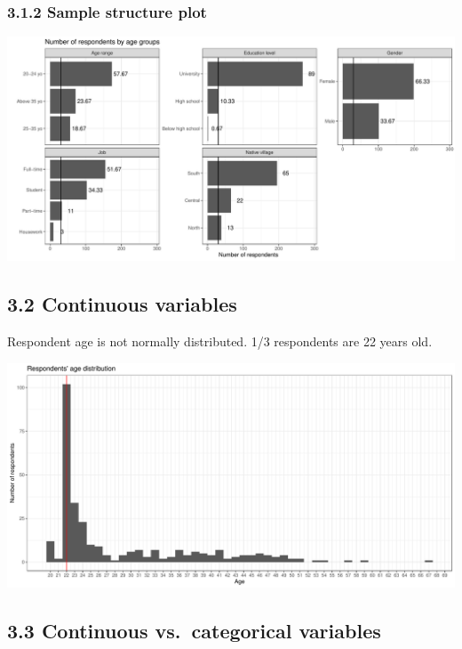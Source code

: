 \documentclass[]{article}
\begin{document}
\hypertarget{sample-structure-plot}{%
\subsubsection{3.1.2 Sample structure
plot}\label{sample-structure-plot}}

\includegraphics{Consumer-attitude-towards-fish-sauce-products_files/figure-latex/unnamed-chunk-6-1.pdf}

\hypertarget{continuous-variables}{%
\subsection{3.2 Continuous variables}\label{continuous-variables}}

Respondent age is not normally distributed. 1/3 respondents are 22 years
old.

\includegraphics{Consumer-attitude-towards-fish-sauce-products_files/figure-latex/unnamed-chunk-7-1.pdf}

\hypertarget{continuous-vs.-categorical-variables}{%
\subsection{3.3 Continuous vs.~categorical
variables}\label{continuous-vs.-categorical-variables}}
\end{document}
